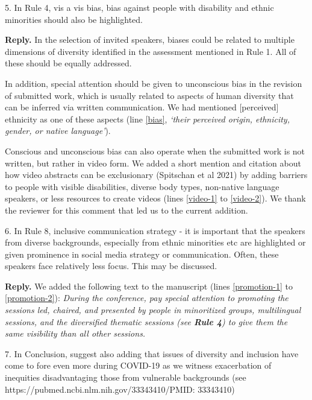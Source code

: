 \documentclass{article}
\newenvironment{Reply}{\noindent\color{BlueViolet}\textbf{Reply.}}{\vspace{1em}}
\begin{document}
5. In Rule 4, vis a vis bias, bias against people with disability and ethnic minorities should also be highlighted.

\begin{Reply}
    In the selection of invited speakers, biases could be related to multiple dimensions of diversity identified in the assessment mentioned in Rule 1. 
    All of these should be equally addressed. 

    In addition, special attention should be given to unconscious bias in the revision of submitted work, which is usually related to aspects of human diversity that can be inferred via written communication.
    We had mentioned [perceived] ethnicity as one of these aspects  (line \ref{bias}, \textit{`their perceived origin, ethnicity, gender, or native language'}). 
    
    Conscious and unconscious bias can also operate when the submitted work is not written, but rather in video form. We added a short mention and citation about how video abstracts can be exclusionary (Spitschan et al 2021) by adding barriers to people with visible disabilities, diverse body types, non-native language speakers, or less resources to create videos (lines \ref{video-1} to \ref{video-2}).
    We thank the reviewer for this comment that led us to the current addition.
\end{Reply}

6. In Rule 8, inclusive communication strategy - it is important that the speakers from diverse backgrounds, especially from ethnic minorities etc are highlighted or given prominence in social media strategy or communication. Often, these speakers face relatively less focus. This may be discussed.

\begin{Reply}
    We added the following text to the manuscript (lines \ref{promotion-1} to \ref{promotion-2}): 
    \textit{During the conference, pay special attention to promoting the sessions led, chaired, and presented by people in minoritized groups, multilingual sessions, and the diversified thematic sessions (see \textbf{Rule 4}) to give them the same visibility than all other sessions.}
\end{Reply}

7. In Conclusion, suggest also adding that issues of diversity and inclusion have come to fore even more during COVID-19 as we witness exacerbation of inequities disadvantaging those from vulnerable backgrounds (see https://pubmed.ncbi.nlm.nih.gov/33343410/PMID: 33343410)
\end{document}
